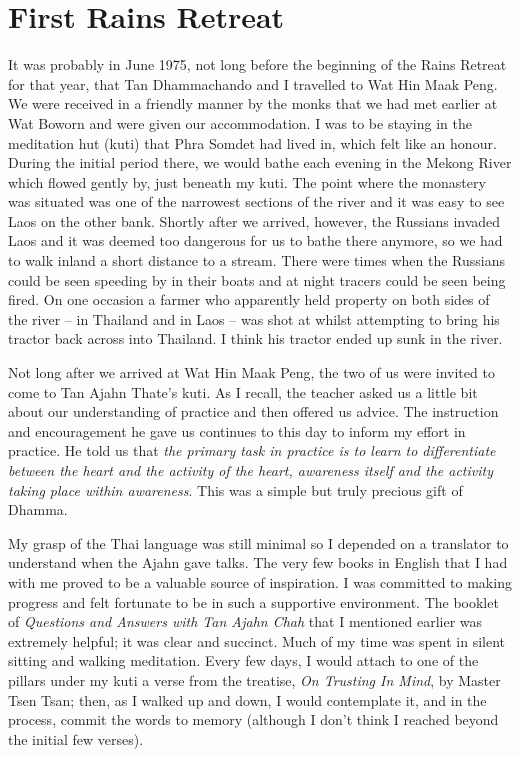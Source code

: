 \chapter{First Rains Retreat}

It was probably in June 1975, not long before the beginning of the Rains
Retreat for that year, that Tan Dhammachando and I travelled to Wat Hin
Maak Peng. We were received in a friendly manner by the monks that we
had met earlier at Wat Boworn and were given our accommodation. I was to
be staying in the meditation hut (kuti) that Phra Somdet had lived in,
which felt like an honour. During the initial period there, we would
bathe each evening in the Mekong River which flowed gently by, just
beneath my kuti. The point where the monastery was situated was one of
the narrowest sections of the river and it was easy to see Laos on the
other bank. Shortly after we arrived, however, the Russians invaded Laos
and it was deemed too dangerous for us to bathe there anymore, so we had
to walk inland a short distance to a stream. There were times when the Russians
could be seen speeding by in their boats and at night tracers could be
seen being fired. On one occasion a farmer who apparently held property
on both sides of the river -- in Thailand and in Laos -- was shot at
whilst attempting to bring his tractor back across into Thailand. I
think his tractor ended up sunk in the river.

Not long after we arrived at Wat Hin Maak Peng, the two of us were
invited to come to Tan Ajahn Thate's kuti. As I recall, the teacher
asked us a little bit about our understanding of practice and then
offered us advice. The instruction and encouragement he gave us
continues to this day to inform my effort in practice. He told us that
\emph{the primary task in practice is to learn to differentiate between
the heart and the activity of the heart, awareness itself and the
activity taking place within awareness}. This was a simple but truly
precious gift of Dhamma.

My grasp of the Thai language was still minimal so I depended on a
translator to understand when the Ajahn gave talks. The very few books
in English that I had with me proved to be a valuable source of
inspiration. I was committed to making progress and felt fortunate to be
in such a supportive environment. The booklet of \emph{Questions and
Answers with Tan Ajahn Chah} that I mentioned earlier was extremely
helpful; it was clear and succinct. Much of my time was spent
in silent sitting and walking meditation. Every few days, I would attach
to one of the pillars under my kuti a verse from the treatise, \emph{On
Trusting In Mind}, by Master Tsen Tsan; then, as I walked up and down, I
would contemplate it, and in the process, commit the words to memory
(although I don't think I reached beyond the initial few verses).

